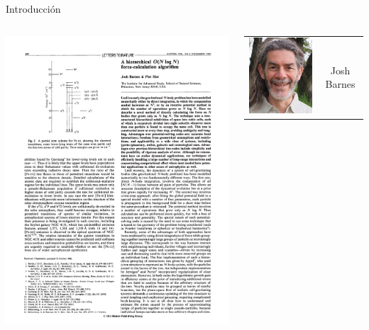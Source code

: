 \documentclass[handout]{beamer}
\begin{document}
\begin{frame}{Introducci\'on}
	\centering
	\begin{columns}
		\begin{column}{.5\textwidth}
			\includegraphics[height=0.8\textheight]{sources/images/barnes1986.pdf}
		\end{column}
		\begin{column}{.5\textwidth}
			\centering
			\begin{tabular}{cc}
				\includegraphics[height=0.3\textheight]{sources/images/barnes.jpg} & Josh Barnes\\

\end{tabular}
\end{column}
\end{columns}
\end{frame}
\end{document}
